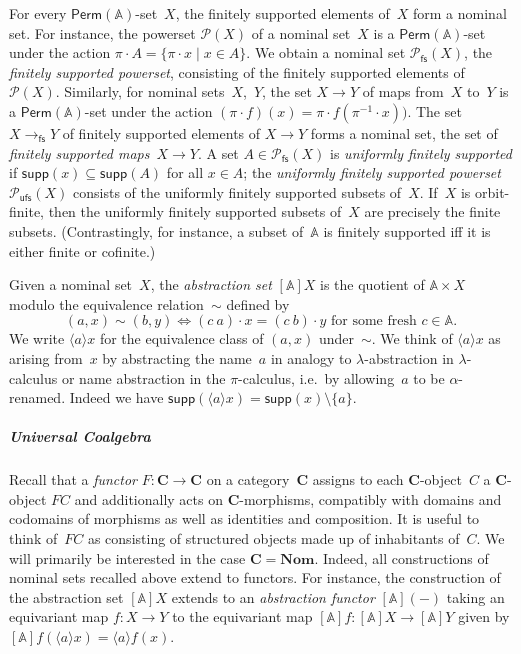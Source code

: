\documentclass[11pt,a4paper]{amsart}
\newcommand{\Perm}{\mathsf{Perm}(\Names)}
\newcommand{\fs}{\mathsf{fs}}
\newcommand{\Names}{\mathbb{A}}
\newcommand{\powufs}{\pow_{\mathsf{ufs}}}
\newcommand{\pow}{\mathcal{P}}
\newcommand{\powfs}{\pow_{\fs}}
\newcommand{\supp}{\mathsf{supp}}
\newcommand{\bind}[1]{\langle #1\rangle}
\theoremstyle{plain}
\numberwithin{equation}{section}
\newcommand{\+}[1]{\mathcal{#1}\xspace}
\newcommand{\Nom}{\mathbf{Nom}}
\newcommand{\BC}{\mathbf{C}}
\newcommand{\names}{\mathbb{A}}
\theoremstyle{definition}
\begin{document}
For every $\Perm$-set~$X$, the finitely supported elements of~$X$ form
a nominal set. For instance, the powerset $\pow(X)$ of a nominal
set~$X$ is a $\Perm$-set under the action
$\pi\cdot A=\{\pi\cdot x\mid x\in A\}$. We obtain a nominal set
$\powfs(X)$, the \emph{finitely supported powerset}, consisting of the
finitely supported elements of~$\pow(X)$. Similarly, for nominal
sets~$X$,~$Y$, the set $X\to Y$ of maps from~$X$ to~$Y$ is a
$\Perm$-set under the action
$(\pi\cdot f)(x)=\pi\cdot f(\pi^{-1}\cdot x))$. The set $X\to_\fs Y$
of finitely supported elements of $X\to Y$ forms a nominal set, the
set of \emph{finitely supported maps}~$X\to Y$. A set $A\in\powfs(X)$
is \emph{uniformly finitely supported} if $\supp(x)\subseteq\supp(A)$
for all $x\in A$; the \emph{uniformly finitely supported powerset}
$\powufs(X)$ consists of the uniformly finitely supported subsets
of~$X$. If~$X$ is orbit-finite, then the uniformly finitely supported
subsets of~$X$ are precisely the finite subsets. (Contrastingly, for
instance, a subset of~$\names$ is finitely supported iff it is either
finite or cofinite.)

Given a nominal set~$X$, the \emph{abstraction set} $[\Names]X$ is the
quotient of $\Names\times X$ modulo the equivalence relation~$\sim$
defined by
\begin{equation*}
  (a,x)\sim(b,y)\iff (c\ a)\cdot x=(c\ b)\cdot y\text{ for some fresh~$c\in\Names$}.
\end{equation*}
We write $\bind{a}x$ for the equivalence class of $(a,x)$
under~$\sim$. We think of $\bind{a}x$ as arising from~$x$ by
abstracting the name~$a$ in analogy to $\lambda$-abstraction in
$\lambda$-calculus or name abstraction in the $\pi$-calculus, i.e.~by
allowing~$a$ to be $\alpha$-renamed. Indeed we have
$\supp(\bind{a}x)=\supp(x)\setminus\{a\}$.







\subparagraph*{Universal Coalgebra} Recall that a \emph{functor}
$F\colon \BC\to\BC$ on a category~$\BC$ assigns to each
$\BC$-object~$C$ a $\BC$-object $FC$ and additionally acts on
$\BC$-morphisms, compatibly with domains and codomains of morphisms as
well as identities and composition. It is useful to think of~$FC$ as
consisting of structured objects made up of inhabitants of~$C$. We
will primarily be interested in the case $\BC=\Nom$. Indeed, all
constructions of nominal sets recalled above extend to functors. For
instance, the construction of the abstraction set $[\Names]X$ extends
to an \emph{abstraction functor} $[\Names](-)$ taking an equivariant
map $f\colon X\to Y$ to the equivariant map
$[\Names]f \colon [\Names]X\to [\Names]Y$ given by
$[\Names]f(\bind{a}x)=\bind{a}f(x)$.
\end{document}
